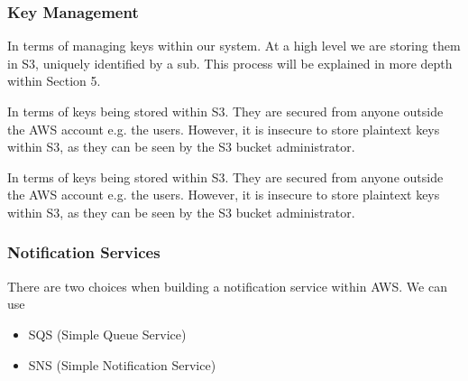 \documentclass[runningheads]{llncs}
\begin{document}
\begin{figure}[H]
\centering
{}
\centering
\label{SRate}
\end{figure}

\subsubsection{Key Management}
In terms of managing keys within our system. At a high level we are storing them in S3, uniquely identified by a sub. This process will be explained in more depth within Section 5.

In terms of keys being stored within S3. They are secured from anyone outside the AWS account e.g. the users. However, it is insecure to store plaintext keys within S3, as they can be seen by the S3 bucket administrator.

In terms of keys being stored within S3. They are secured from anyone outside the AWS account e.g. the users. However, it is insecure to store plaintext keys within S3, as they can be seen by the S3 bucket administrator.

\subsubsection{Notification Services}
There are two choices when building a notification service within AWS. We can use

\begin{itemize}
	\item SQS (Simple Queue Service)
	\item SNS (Simple Notification Service)
\end{itemize}
\end{document}
